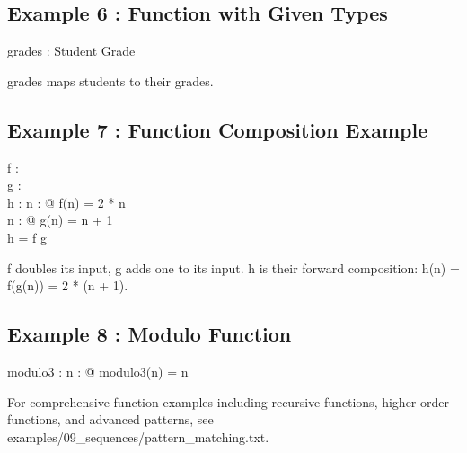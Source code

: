 \documentclass[a4paper,10pt,fleqn]{article}
\begin{document}
\subsection*{Example 6 : Function with Given Types}

\begin{zed}
\end{zed}

\begin{axdef}
grades : Student \pfun Grade
\end{axdef}

\noindent grades maps students to their grades.

\bigskip

\subsection*{Example 7 : Function Composition Example}

\begin{axdef}
f : \nat \fun \nat \\
g : \nat \fun \nat \\
h : \nat \fun \nat
\where
\forall n : \nat @ f(n) = 2 * n \\
\forall n : \nat @ g(n) = n + 1 \\
h = f \comp g
\end{axdef}

\noindent f doubles its input, g adds one to its input. h is their forward composition: h(n) = f(g(n)) = 2 * (n + 1).

\bigskip

\subsection*{Example 8 : Modulo Function}

\begin{axdef}
modulo3 : \nat \fun \nat
\where
\forall n : \nat @ modulo3(n) = n 
\end{axdef}

\noindent For comprehensive function examples including recursive functions, higher-order functions, and advanced patterns, see examples/09\_sequences/pattern\_matching.txt.

\bigskip
\end{document}
